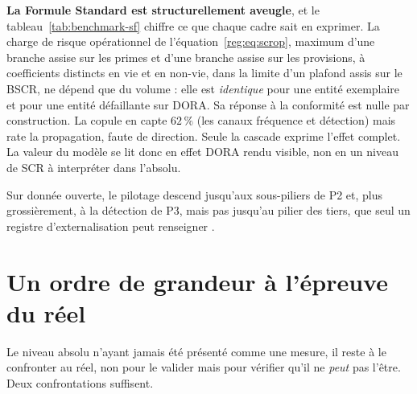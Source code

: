 \textbf{La Formule Standard est structurellement aveugle}, et le tableau~\ref{tab:benchmark-sf}
chiffre ce que chaque cadre sait en exprimer. La charge de risque opérationnel
de l'équation~\eqref{reg:eq:scrop}, maximum d'une branche assise sur les primes et d'une branche
assise sur les provisions, à coefficients distincts en vie et en non-vie, dans la limite d'un
plafond assis sur le BSCR, ne dépend que du volume : elle est \emph{identique} pour une entité
exemplaire et pour une entité défaillante sur DORA. Sa réponse à la conformité est nulle par
construction. La copule en capte $62\,\%$ (les canaux fréquence et détection) mais rate la
propagation, faute de direction. Seule la cascade exprime l'effet complet. La valeur du
modèle se lit donc en effet DORA rendu visible, non en un niveau de SCR à
interpréter dans l'absolu.

Sur donnée ouverte, le pilotage descend jusqu'aux sous-piliers de P2 et, plus grossièrement, à
la détection de P3, mais pas jusqu'au pilier des tiers, que seul un registre d'externalisation
peut renseigner \matcomp.

\section{Un ordre de grandeur à l'épreuve du réel}

Le niveau absolu n'ayant jamais été présenté comme une mesure, il reste à le confronter au
réel, non pour le valider mais pour vérifier qu'il ne \emph{peut} pas l'être. Deux
confrontations suffisent.


